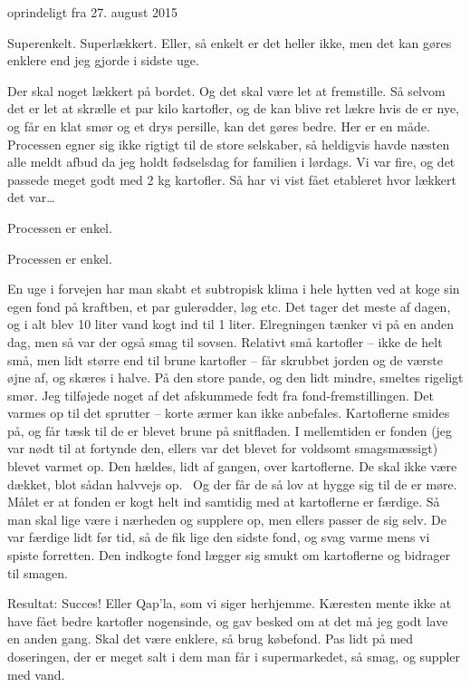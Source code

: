 \documentclass[
  letterpaper,
  DIV=11,
  numbers=noendperiod]{scrreprt}
\begin{document}
oprindeligt fra 27. august 2015

Superenkelt. Superlækkert. Eller, så enkelt er det heller ikke, men det
kan gøres enklere end jeg gjorde i sidste uge.

Der skal noget lækkert på bordet. Og det skal være let at fremstille. Så
selvom det er let at skrælle et par kilo kartofler, og de kan blive ret
lækre hvis de er nye, og får en klat smør og et drys persille, kan det
gøres bedre. Her er en måde. Processen egner sig ikke rigtigt til de
store selskaber, så heldigvis havde næsten alle meldt afbud da jeg holdt
fødselsdag for familien i lørdags. Vi var fire, og det passede meget
godt med 2 kg kartofler. Så har vi vist fået etableret hvor lækkert det
var\ldots{}

Processen er enkel.~

Processen er enkel.~

En uge i forvejen har man skabt et subtropisk klima i hele hytten ved at
koge sin egen fond på kraftben, et par gulerødder, løg etc. Det tager
det meste af dagen, og i alt blev 10 liter vand kogt ind til 1 liter.
Elregningen tænker vi på en anden dag, men så var der også smag til
sovsen. Relativt små kartofler -- ikke de helt små, men lidt større end
til brune kartofler -- får skrubbet jorden og de værste øjne af, og
skæres i halve. På den store pande, og den lidt mindre, smeltes rigeligt
smør. Jeg tilføjede noget af det afskummede fedt fra
fond-fremstillingen. Det varmes op til det sprutter -- korte ærmer kan
ikke anbefales. Kartoflerne smides på, og får tæsk til de er blevet
brune på snitfladen. I mellemtiden er fonden (jeg var nødt til at
fortynde den, ellers var det blevet for voldsomt smagsmæssigt) blevet
varmet op. Den hældes, lidt af gangen, over kartoflerne. De skal ikke
være dækket, blot sådan halvvejs op.~ Og der får de så lov at hygge sig
til de er møre. Målet er at fonden er kogt helt ind samtidig med at
kartoflerne er færdige. Så man skal lige være i nærheden og supplere op,
men ellers passer de sig selv. De var færdige lidt før tid, så de fik
lige den sidste fond, og svag varme mens vi spiste forretten. Den
indkogte fond lægger sig smukt om kartoflerne og bidrager til smagen.

Resultat: Succes! Eller Qap'la, som vi siger herhjemme. Kæresten mente
ikke at have fået bedre kartofler nogensinde, og gav besked om at det må
jeg godt lave en anden gang. Skal det være enklere, så brug købefond.
Pas lidt på med doseringen, der er meget salt i dem man får i
supermarkedet, så smag, og suppler med vand.
\end{document}
